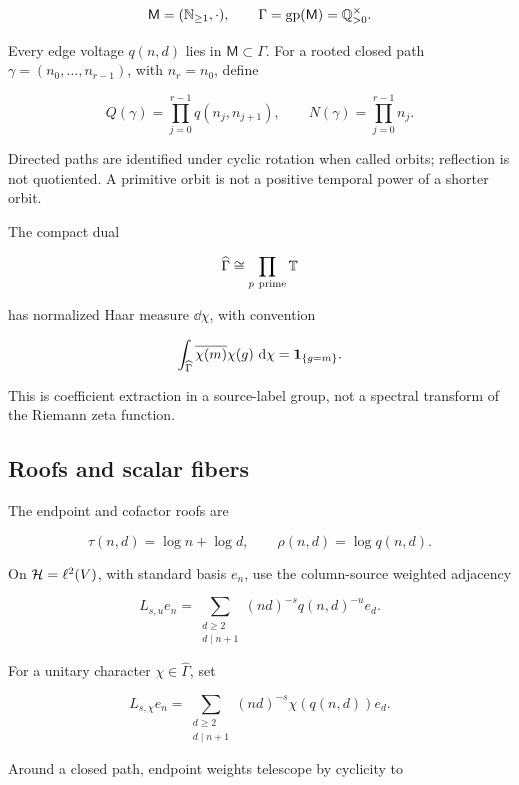 \[
 \mathsf M=(\mathbb N_{\ge1},\cdot),
 \qquad
 \Gamma=\operatorname{gp}(\mathsf M)=\mathbb Q_{>0}^{\times}.
\]

Every edge voltage \(q(n,d)\) lies in \(\mathsf M\subset\Gamma\).  For a
rooted closed path
\(\gamma=(n_0,\ldots,n_{r-1})\), with \(n_r=n_0\), define

\[
 Q(\gamma)=\prod_{j=0}^{r-1}q(n_j,n_{j+1}),
 \qquad
 N(\gamma)=\prod_{j=0}^{r-1}n_j.
\]

Directed paths are identified under cyclic rotation when called orbits;
reflection is not quotiented.  A primitive orbit is not a positive temporal
power of a shorter orbit.

The compact dual

\[
 \widehat\Gamma\cong\prod_{p\ \mathrm{prime}}\T
\]

has normalized Haar measure \(\dd\chi\), with convention

\begin{equation}
 \int_{\widehat\Gamma}\overline{\chi(m)}\chi(g)\,\,\mathrm d\chi
 =\mathbf 1_{\{g=m\}}.
\label{eq:haar}
\end{equation}

This is coefficient extraction in a source-label group, not a spectral
transform of the Riemann zeta function.

\subsection{Roofs and scalar fibers}

The endpoint and cofactor roofs are

\[
 \tau(n,d)=\log n+\log d,
 \qquad
 \rho(n,d)=\log q(n,d).
\]

On \(\mathcal H=\ell^2(V)\), with standard basis \(e_n\), use the column-source
weighted adjacency

\begin{equation}
 L_{s,u}e_n=
 \sum_{\substack{d\ge2\\d\mid n+1}}
 (nd)^{-s}q(n,d)^{-u}e_d.
\label{eq:Lsu}
\end{equation}

For a unitary character \(\chi\in\widehat\Gamma\), set

\begin{equation}
 L_{s,\chi}e_n=
 \sum_{\substack{d\ge2\\d\mid n+1}}
 (nd)^{-s}\chi(q(n,d))e_d.
\label{eq:Lschi}
\end{equation}

Around a closed path, endpoint weights telescope by cyclicity to

